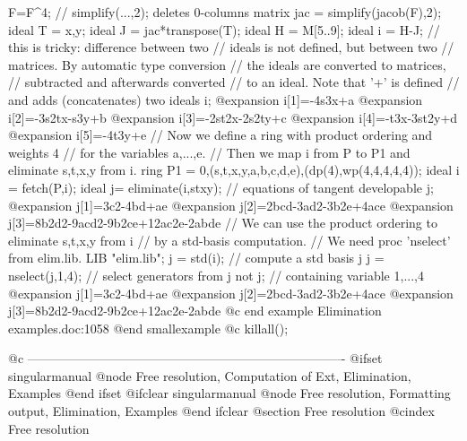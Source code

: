   F=F^4;
  // simplify(...,2); deletes 0-columns
  matrix jac = simplify(jacob(F),2);
  ideal T = x,y;
  ideal J = jac*transpose(T);
  ideal H = M[5..9];
  ideal i = H-J;         // this is tricky: difference between two
                         // ideals is not defined, but between two
                         // matrices. By automatic type conversion
                         // the ideals are converted to matrices,
                         // subtracted and afterwards converted
                         // to an ideal. Note that '+' is defined
                         // and adds (concatenates) two ideals
  i;
@expansion{} i[1]=-4s3x+a
@expansion{} i[2]=-3s2tx-s3y+b
@expansion{} i[3]=-2st2x-2s2ty+c
@expansion{} i[4]=-t3x-3st2y+d
@expansion{} i[5]=-4t3y+e
  // Now we define a ring with product ordering and weights 4
  // for the variables a,...,e.
  // Then we map i from P to P1 and eliminate s,t,x,y from i.
  ring P1 = 0,(s,t,x,y,a,b,c,d,e),(dp(4),wp(4,4,4,4,4));
  ideal i = fetch(P,i);
  ideal j= eliminate(i,stxy);    // equations of tangent developable
  j;
@expansion{} j[1]=3c2-4bd+ae
@expansion{} j[2]=2bcd-3ad2-3b2e+4ace
@expansion{} j[3]=8b2d2-9acd2-9b2ce+12ac2e-2abde
  // We can use the product ordering to eliminate s,t,x,y from i
  // by a std-basis computation.
  // We need proc 'nselect' from elim.lib.
  LIB "elim.lib";
  j = std(i);                    // compute a std basis j
  j = nselect(j,1,4);            // select generators from j not
  j;                             // containing variable 1,...,4
@expansion{} j[1]=3c2-4bd+ae
@expansion{} j[2]=2bcd-3ad2-3b2e+4ace
@expansion{} j[3]=8b2d2-9acd2-9b2ce+12ac2e-2abde
@c end example Elimination examples.doc:1058
@end smallexample
@c  killall();


@c ----------------------------------------------------------------------------
@ifset singularmanual
@node Free resolution, Computation of Ext, Elimination, Examples
@end ifset
@ifclear singularmanual
@node Free resolution, Formatting output, Elimination, Examples
@end ifclear
@section  Free resolution
@cindex  Free resolution

